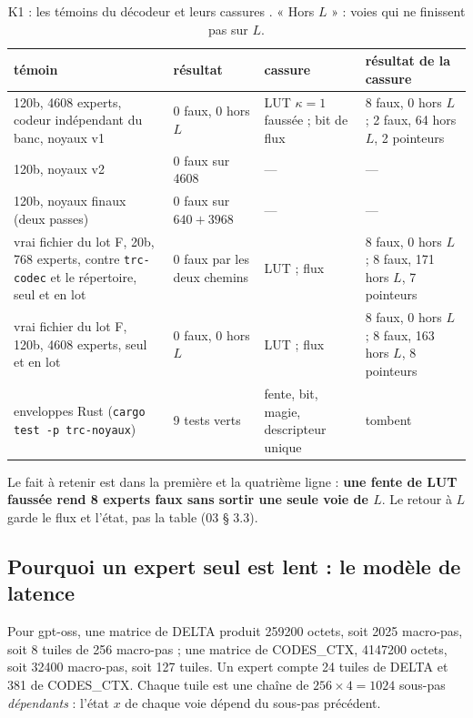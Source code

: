 \begin{table}[!htbp]
\centering\small
\caption[K1 : témoins et cassures]{K1 : les témoins du décodeur et leurs cassures \mes. « Hors $L$ » : voies qui ne finissent pas sur $L$.}
\label{tab:t2n-temoins-k1}
\begin{tabularx}{\linewidth}{@{}p{4.4cm}p{2.5cm}p{2.9cm}X@{}}
\toprule
témoin & résultat & cassure & résultat de la cassure \\
\midrule
120b, \num{4608} experts, codeur indépendant du banc, noyaux v1 & 0 faux, 0 hors $L$ & LUT $\kappa = 1$ faussée ; bit de flux & 8 faux, 0 hors $L$ ; 2 faux, 64 hors $L$, 2 pointeurs \\
120b, noyaux v2 & 0 faux sur \num{4608} & — & — \\
120b, noyaux finaux (deux passes) & 0 faux sur $640 + \num{3968}$ & — & — \\
vrai fichier du lot F, 20b, 768 experts, contre \texttt{trc-codec} et le répertoire, seul et en lot & 0 faux par les deux chemins & LUT ; flux & 8 faux, 0 hors $L$ ; 8 faux, 171 hors $L$, 7 pointeurs \\
vrai fichier du lot F, 120b, \num{4608} experts, seul et en lot & 0 faux, 0 hors $L$ & LUT ; flux & 8 faux, 0 hors $L$ ; 8 faux, 163 hors $L$, 8 pointeurs \\
enveloppes Rust (\texttt{cargo test -p trc-noyaux}) & 9 tests verts & fente, bit, magie, descripteur unique & tombent \\
\bottomrule
\end{tabularx}
\end{table}

Le fait à retenir est dans la première et la quatrième ligne : \textbf{une fente de LUT faussée rend 8 experts faux sans sortir une seule voie de $L$}. Le retour à $L$ garde le flux et l'état, pas la table (03 § 3.3).

\subsection{Pourquoi un expert seul est lent : le modèle de latence}

Pour gpt-oss, une matrice de DELTA produit \num{259200} octets, soit \num{2025} macro-pas, soit 8 tuiles de 256 macro-pas ; une matrice de CODES\_CTX, \num{4147200} octets, soit \num{32400} macro-pas, soit 127 tuiles. Un expert compte 24 tuiles de DELTA et 381 de CODES\_CTX. Chaque tuile est une chaîne de $256 \times 4 = \num{1024}$ sous-pas \emph{dépendants} : l'état $x$ de chaque voie dépend du sous-pas précédent.

